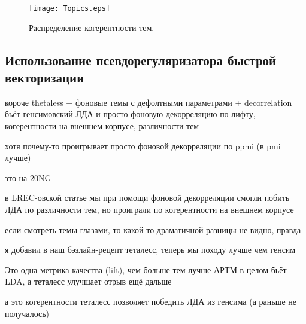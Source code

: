 \begin{figure}[!ht]
    \centering
    \texttt{[image: Topics.eps]}
    \caption{Распределение когерентности тем.}
\label{topics_distribution}
\end{figure}

\subsection{Использование псевдорегуляризатора быстрой векторизации}
короче thetaless + фоновые темы с дефолтными параметрами + decorrelation бьёт генсимовский ЛДА и просто фоновую декорреляцию по лифту, когерентности на внешнем корпусе, различности тем

хотя почему-то проигрывает просто фоновой декорреляции по ppmi (в pmi лучше)

это на 20NG

в LREC-овской статье мы при помощи фоновой декорреляции смогли побить ЛДА по различности тем, но проиграли по когерентности на внешнем корпусе

если смотреть темы глазами, то какой-то драматичной разницы не видно, правда

я добавил в наш бэзлайн-рецепт теталесс, теперь мы походу лучше чем генсим

Это одна метрика качества (lift), чем больше тем лучше
АРТМ в целом бьёт LDA, а теталесс улучшает отрыв ещё дальше


а это когерентности
теталесс позволяет победить ЛДА из генсима (а раньше не получалось)





